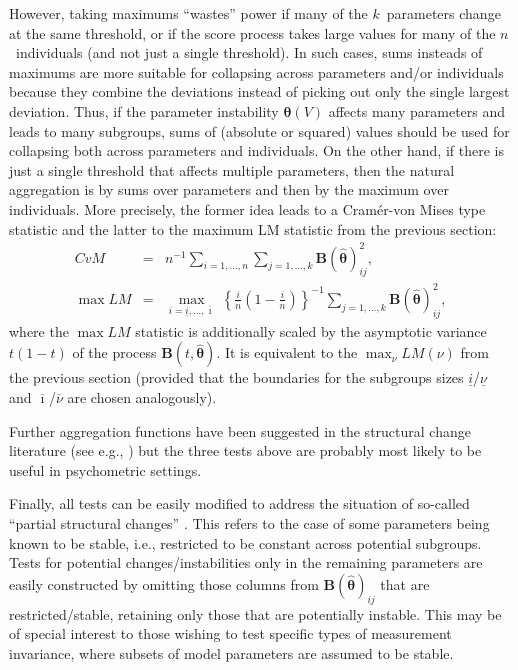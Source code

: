 \documentclass[man]{apa}
\begin{document}
However, taking maximums ``wastes'' power if many of the $k$~parameters change
at the same threshold, or if the score process takes large values for
many of the $n$~individuals (and not just a single threshold). In such
cases, sums insteads of maximums are more suitable for collapsing across
parameters and/or individuals because they combine the deviations instead of
picking out only the single largest deviation. Thus, if the parameter instability
${\bm \theta}(V)$ affects many parameters and leads to many subgroups, sums
of (absolute or squared) values should be used for collapsing both across
parameters and individuals. On the other hand, if there is just a single
threshold that affects multiple parameters, then the natural aggregation
is by sums over parameters and then by the maximum over individuals.
More precisely, the former idea leads to a Cram{\'e}r-von Mises type
statistic and the latter to the maximum LM statistic from the previous section:
\begin{eqnarray}
    \label{eq:cvm}
    \mathit{CvM}     & = & n^{-1} \sum_{i = 1,\dots, n} \sum_{j = 1, \dots, k} {\bm B}(\hat {\bm \theta})_{ij}^2, \\
    \label{eq:maxlm}
    \max \mathit{LM} & = & \max_{i = \underline{i}, \dots, \overline{\imath}} ~
      \left\{ \frac{i}{n} \left( 1 - \frac{i}{n} \right) \right\}^{-1}
      \sum_{j = 1, \dots, k} {\bm B}(\hat {\bm \theta})_{ij}^2,
\end{eqnarray}
where the $\max \mathit{LM}$ statistic is additionally scaled by the
asymptotic variance $t (1 - t)$ of the process ${\bm B}(t, \hat {\bm \theta})$.
It is equivalent to the $\max_\nu \mathit{LM}(\nu)$ from the previous
section (provided that the boundaries for the subgroups sizes $\underline{i}$/$\underline{\nu}$
and $\overline{\imath}$/$\overline{\nu}$ are chosen analogously).

Further aggregation functions have been suggested in the structural
change literature (see e.g., ) but the three
tests above are probably most likely to be useful in psychometric settings.

Finally, all tests can be easily modified to address the situation of
so-called ``partial structural changes'' \cite{And93}. This refers to the case of some
parameters being known to be stable, i.e., restricted to be constant across
potential subgroups. Tests for potential changes/instabilities only in the
remaining parameters are easily constructed by omitting those columns from
${\bm B}(\hat {\bm \theta})_{ij}$ that are restricted/stable,
retaining only those
that are potentially instable. This may be of special interest to
those wishing to test specific types of measurement invariance, where
subsets of model parameters are assumed to be stable.
\end{document}
